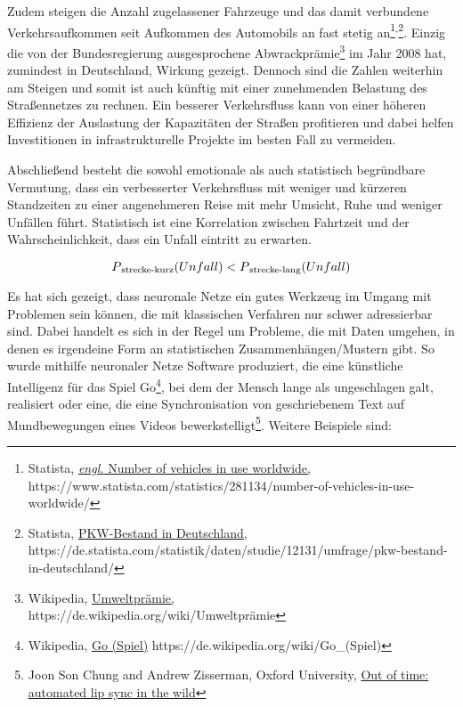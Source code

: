 Zudem steigen die Anzahl zugelassener Fahrzeuge und das damit verbundene Verkehrsaufkommen seit Aufkommen des Automobils an fast stetig an\footnote{Statista, \href{https://www.statista.com/statistics/281134/number-of-vehicles-in-use-worldwide/}{\textit{engl.} Number of vehicles in use worldwide,} \\https://www.statista.com/statistics/281134/number-of-vehicles-in-use-worldwide/}\textsuperscript{,}\footnote{Statista, \href{https://de.statista.com/statistik/daten/studie/12131/umfrage/pkw-bestand-in-deutschland/}{PKW-Bestand in Deutschland,} \\https://de.statista.com/statistik/daten/studie/12131/umfrage/pkw-bestand-in-deutschland/}. Einzig die von der Bundesregierung ausgesprochene Abwrackprämie\footnote{Wikipedia, \href{https://de.wikipedia.org/wiki/Umweltpr\%C3\%A4mie}{Umweltprämie,} \\ https://de.wikipedia.org/wiki/Umweltprämie} im Jahr 2008 hat, zumindest in Deutschland, Wirkung gezeigt. Dennoch sind die Zahlen weiterhin am Steigen und somit ist auch künftig mit einer zunehmenden Belastung des Straßennetzes zu rechnen. Ein besserer Verkehrsfluss kann von einer höheren Effizienz der Auslastung der Kapazitäten der Straßen profitieren und dabei helfen Investitionen in infrastrukturelle Projekte im besten Fall zu vermeiden.

Abschließend besteht die sowohl emotionale als auch statistisch begründbare Vermutung, dass ein verbesserter Verkehrsfluss mit weniger und kürzeren Standzeiten zu einer angenehmeren Reise mit mehr Umsicht, Ruhe und weniger Unfällen führt. Statistisch ist eine Korrelation zwischen Fahrtzeit und der Wahrscheinlichkeit, dass ein Unfall eintritt zu erwarten.

\[ P\textsubscript{strecke-kurz}(Unfall) < P\textsubscript{strecke-lang}(Unfall) \]

Es hat sich gezeigt, dass neuronale Netze ein gutes Werkzeug im Umgang mit Problemen sein können, die mit klassischen Verfahren nur schwer adressierbar sind. Dabei handelt es sich in der Regel um Probleme, die mit Daten umgehen, in denen es irgendeine Form an statistischen Zusammenhängen/Mustern gibt. So wurde mithilfe neuronaler Netze Software produziert, die eine künstliche Intelligenz für das Spiel Go\footnote{Wikipedia, \href{https://de.wikipedia.org/wiki/Go\_(Spiel)}{Go (Spiel)} https://de.wikipedia.org/wiki/Go\_(Spiel)}, bei dem der Mensch lange als ungeschlagen galt, realisiert oder eine, die eine Synchronisation von geschriebenem Text auf Mundbewegungen eines Videos bewerkstelligt\footnote{Joon Son Chung and Andrew Zisserman, Oxford University, \href{https://www.robots.ox.ac.uk/~vgg/publications/2016/Chung16a/chung16a.pdf}{Out of time: automated lip sync in the wild}}. Weitere Beispiele sind:


